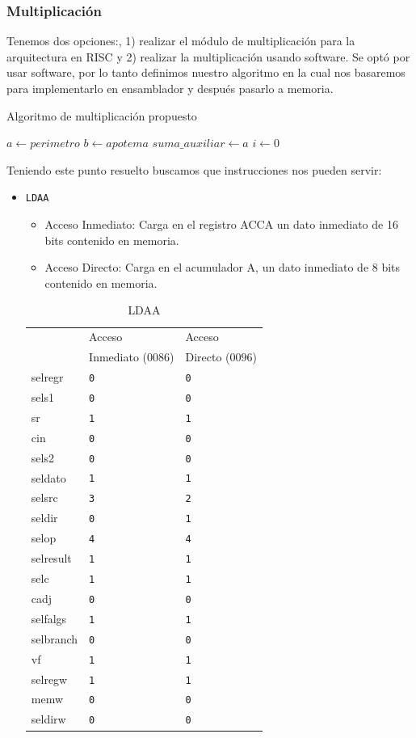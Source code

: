 \documentclass{IEEEtran}
\begin{document}
\subsubsection{Multiplicación}
\label{sec:org2da015f}
Tenemos dos opciones:, 1) realizar el módulo de multiplicación para la arquitectura en RISC y 2) realizar la multiplicación usando software. Se optó por usar software, por lo tanto definimos nuestro algoritmo en la cual nos basaremos para implementarlo en ensamblador y después pasarlo a memoria.
\begin{algorithm}
\caption{Algoritmo de multiplicación propuesto}
$a \gets perimetro$\;
$b \gets apotema$\;
$suma\_auxiliar \gets a$\;
$i \gets 0$\;
\end{algorithm}
Teniendo este punto resuelto buscamos que instrucciones nos pueden servir\cite[pp. 24-26]{PM1999}:
\begin{itemize}
\item \texttt{LDAA}
\begin{itemize}
\item Acceso Inmediato: Carga en el registro ACCA un dato inmediato de 16 bits contenido en memoria.
\item Acceso Directo: Carga en el acumulador A, un dato inmediato de 8 bits contenido en memoria.
\end{itemize}
\begin{table}[htbp]
\caption{LDAA}
\centering
\begin{tabular}{lll}
\hline
 & Acceso & Acceso\\
 & Inmediato (\(0086\)) & Directo (\(0096\))\\
\hline
selregr & \texttt{0} & \texttt{0}\\
sels1 & \texttt{0} & \texttt{0}\\
sr & \texttt{1} & \texttt{1}\\
cin & \texttt{0} & \texttt{0}\\
sels2 & \texttt{0} & \texttt{0}\\
seldato & \texttt{1} & \texttt{1}\\
selsrc & \texttt{3} & \texttt{2}\\
seldir & \texttt{0} & \texttt{1}\\
selop & \texttt{4} & \texttt{4}\\
selresult & \texttt{1} & \texttt{1}\\
selc & \texttt{1} & \texttt{1}\\
cadj & \texttt{0} & \texttt{0}\\
selfalgs & \texttt{1} & \texttt{1}\\
selbranch & \texttt{0} & \texttt{0}\\
vf & \texttt{1} & \texttt{1}\\
selregw & \texttt{1} & \texttt{1}\\
memw & \texttt{0} & \texttt{0}\\
seldirw & \texttt{0} & \texttt{0}\\
\hline
\end{tabular}
\end{table}
\end{itemize}
\end{document}
